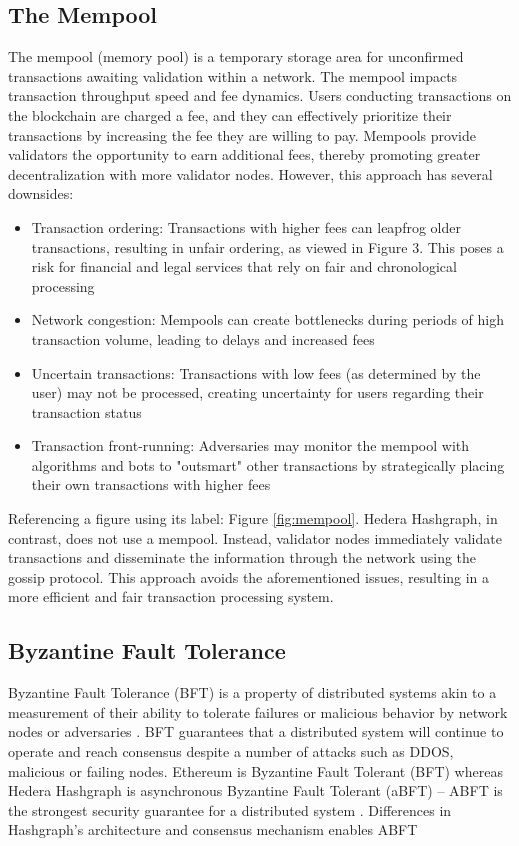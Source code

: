 \documentclass[
	a4paper, %
	10pt, %
	unnumberedsections, %
	twoside, %
]{LTJournalArticle}
\begin{document}
\subsection{The Mempool}
The mempool (memory pool) is a temporary storage area for unconfirmed transactions awaiting validation within a network. The mempool impacts transaction throughput speed and fee dynamics. Users conducting transactions on the blockchain are charged a fee, and they can effectively prioritize their transactions by increasing the fee they are willing to pay. Mempools provide validators the opportunity to earn additional fees, thereby promoting greater decentralization with more validator nodes. However, this approach has several downsides:
\begin{itemize}
    \item Transaction ordering: Transactions with higher fees can leapfrog older transactions, resulting in unfair ordering, as viewed in Figure 3. This poses a risk for financial and legal services that rely on fair and chronological processing
    \item Network congestion: Mempools can create bottlenecks during periods of high transaction volume, leading to delays and increased fees
    \item Uncertain transactions: Transactions with low fees (as determined by the user) may not be processed, creating uncertainty for users regarding their transaction status 
    \item Transaction front-running: Adversaries may monitor the mempool with algorithms and bots to "outsmart" other transactions by strategically placing their own transactions with higher fees
\end{itemize}
Referencing a figure using its label: Figure \ref{fig:mempool}.
Hedera Hashgraph, in contrast, does not use a mempool. Instead, validator nodes immediately validate transactions and disseminate the information through the network using the gossip protocol. This approach avoids the aforementioned issues, resulting in a more efficient and fair transaction processing system.

\subsection{Byzantine Fault Tolerance}
Byzantine Fault Tolerance (BFT) is a property of distributed systems akin to a measurement of their ability to tolerate failures or malicious behavior by network nodes or adversaries \cite{lamport_byzantine_2019}. BFT guarantees that a distributed system will continue to operate and reach consensus despite a number of attacks such as DDOS, malicious or failing nodes.
Ethereum is Byzantine Fault Tolerant (BFT) whereas Hedera Hashgraph is asynchronous Byzantine Fault Tolerant (aBFT) – ABFT is the strongest security guarantee for a distributed system \cite{james_experimental_2019}. Differences in Hashgraph’s architecture and consensus mechanism enables ABFT
\end{document}
